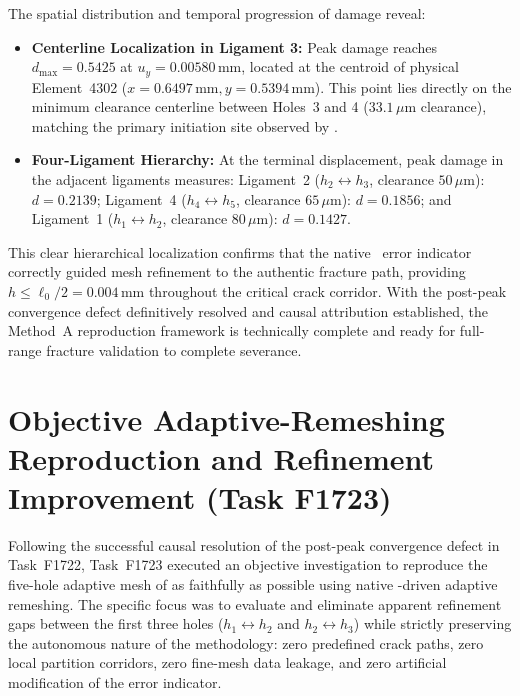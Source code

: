The spatial distribution and temporal progression of damage reveal:
\begin{itemize}
  \item \textbf{Centerline Localization in Ligament 3:} Peak damage reaches $d_{\max} = 0.5425$ at $u_y = 0.00580\,\mathrm{mm}$, located at the centroid of physical Element~4302 ($x = 0.6497\,\mathrm{mm}, y = 0.5394\,\mathrm{mm}$). This point lies directly on the minimum clearance centerline between Holes~3 and 4 ($33.1\,\mu\mathrm{m}$ clearance), matching the primary initiation site observed by \citet[Fig.~23]{pandey2025}.
  \item \textbf{Four-Ligament Hierarchy:} At the terminal displacement, peak damage in the adjacent ligaments measures: Ligament~2 ($h_2 \leftrightarrow h_3$, clearance $50\,\mu\mathrm{m}$): $d = 0.2139$; Ligament~4 ($h_4 \leftrightarrow h_5$, clearance $65\,\mu\mathrm{m}$): $d = 0.1856$; and Ligament~1 ($h_1 \leftrightarrow h_2$, clearance $80\,\mu\mathrm{m}$): $d = 0.1427$.
\end{itemize}

This clear hierarchical localization confirms that the native \Abaqus \MISESERI\ error indicator correctly guided mesh refinement to the authentic fracture path, providing $h \le \ell_0/2 = 0.004\,\mathrm{mm}$ throughout the critical crack corridor. With the post-peak convergence defect definitively resolved and causal attribution established, the Method~A reproduction framework is technically complete and ready for full-range fracture validation to complete severance.

\section{Objective Adaptive-Remeshing Reproduction and Refinement Improvement (Task F1723)}
\label{sec:f1723_adaptive_mesh_reproduction}

Following the successful causal resolution of the post-peak convergence defect in Task~F1722, Task~F1723 executed an objective investigation to reproduce the five-hole adaptive mesh of \citet{pandey2025} as faithfully as possible using native \Abaqus \MISESERI-driven adaptive remeshing. The specific focus was to evaluate and eliminate apparent refinement gaps between the first three holes ($h_1 \leftrightarrow h_2$ and $h_2 \leftrightarrow h_3$) while strictly preserving the autonomous nature of the methodology: zero predefined crack paths, zero local partition corridors, zero fine-mesh data leakage, and zero artificial modification of the error indicator.

